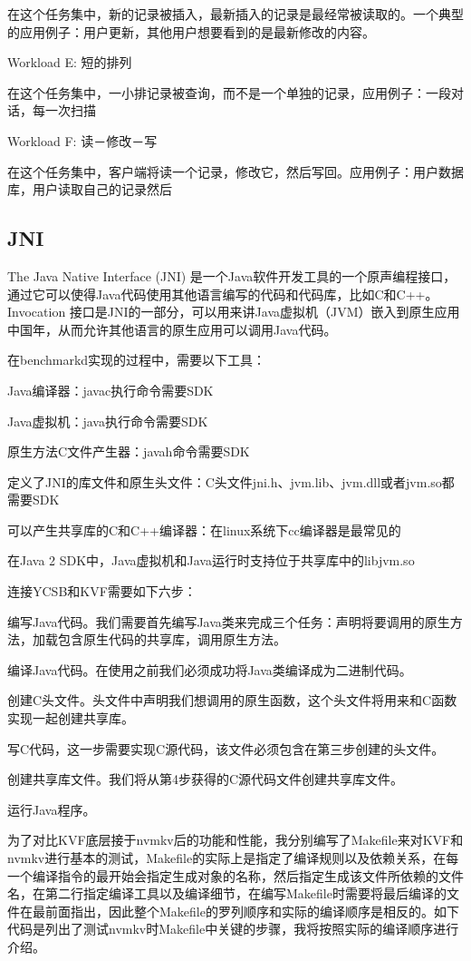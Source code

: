 				在这个任务集中，新的记录被插入，最新插入的记录是最经常被读取的。一个典型的应用例子：用户更新，其他用户想要看到的是最新修改的内容。

		Workload E: 短的排列

				在这个任务集中，一小排记录被查询，而不是一个单独的记录，应用例子：一段对话，每一次扫描

		Workload F: 读－修改－写

				在这个任务集中，客户端将读一个记录，修改它，然后写回。应用例子：用户数据库，用户读取自己的记录然后

	\subsection{JNI}
		The Java Native Interface (JNI) 是一个Java软件开发工具的一个原声编程接口，通过它可以使得Java代码使用其他语言编写的代码和代码库，比如C和C++。 Invocation 接口是JNI的一部分，可以用来讲Java虚拟机（JVM）嵌入到原生应用中国年，从而允许其他语言的原生应用可以调用Java代码。

		在benchmarkd实现的过程中，需要以下工具：

		Java编译器：javac执行命令需要SDK

		Java虚拟机：java执行命令需要SDK

		原生方法C文件产生器：javah命令需要SDK

		定义了JNI的库文件和原生头文件：C头文件jni.h、jvm.lib、jvm.dll或者jvm.so都需要SDK

		可以产生共享库的C和C++编译器：在linux系统下cc编译器是最常见的

		在Java 2 SDK中，Java虚拟机和Java运行时支持位于共享库中的libjvm.so

		连接YCSB和KVF需要如下六步：

		编写Java代码。我们需要首先编写Java类来完成三个任务：声明将要调用的原生方法，加载包含原生代码的共享库，调用原生方法。

		编译Java代码。在使用之前我们必须成功将Java类编译成为二进制代码。

		创建C头文件。头文件中声明我们想调用的原生函数，这个头文件将用来和C函数实现一起创建共享库。

		写C代码，这一步需要实现C源代码，该文件必须包含在第三步创建的头文件。

		创建共享库文件。我们将从第4步获得的C源代码文件创建共享库文件。

		运行Java程序。

		为了对比KVF底层接于nvmkv后的功能和性能，我分别编写了Makefile来对KVF和nvmkv进行基本的测试，Makefile的实际上是指定了编译规则以及依赖关系，在每一个编译指令的最开始会指定生成对象的名称，然后指定生成该文件所依赖的文件名，在第二行指定编译工具以及编译细节，在编写Makefile时需要将最后编译的文件在最前面指出，因此整个Makefile的罗列顺序和实际的编译顺序是相反的。如下代码是列出了测试nvmkv时Makefile中关键的步骤，我将按照实际的编译顺序进行介绍。

